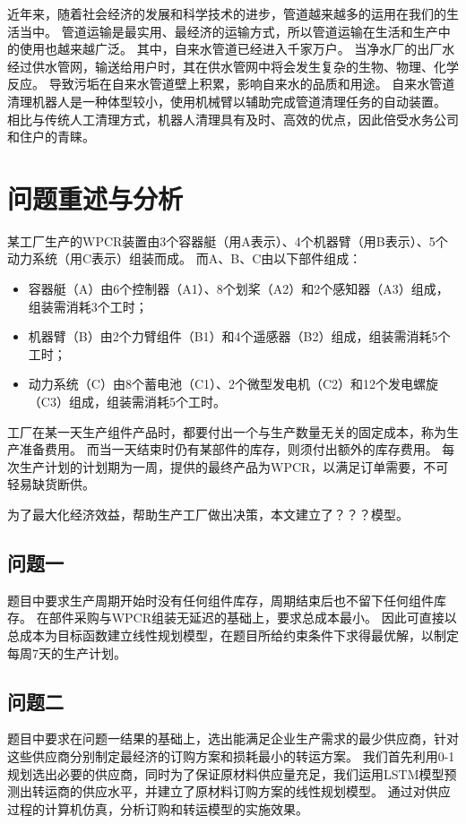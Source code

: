 近年来，随着社会经济的发展和科学技术的进步，管道越来越多的运用在我们的生活当中。
管道运输是最实用、最经济的运输方式，所以管道运输在生活和生产中的使用也越来越广泛\cite{智能管道清理机器人}。
其中，自来水管道已经进入千家万户。
当净水厂的出厂水经过供水管网，输送给用户时，其在供水管网中将会发生复杂的生物、物理、化学反应\cite{基于升力法的贯流式水轮机叶片设计及可行性分析}。
导致污垢在自来水管道壁上积累，影响自来水的品质和用途。
自来水管道清理机器人是一种体型较小，使用机械臂以辅助完成管道清理任务的自动装置。
相比与传统人工清理方式，机器人清理具有及时、高效的优点，因此倍受水务公司和住户的青睐。

\section{问题重述与分析}
某工厂生产的WPCR装置由3个容器艇（用A表示）、4个机器臂（用B表示）、5个动力系统（用C表示）组装而成。
而A、B、C由以下部件组成：
\begin{itemize}
\item 容器艇（A）由6个控制器（A1）、8个划桨（A2）和2个感知器（A3）组成，组装需消耗3个工时；
\item 机器臂（B）由2个力臂组件（B1）和4个遥感器（B2）组成，组装需消耗5个工时；
\item 动力系统（C）由8个蓄电池（C1）、2个微型发电机（C2）和12个发电螺旋（C3）组成，组装需消耗5个工时。
\end{itemize}

工厂在某一天生产组件产品时，都要付出一个与生产数量无关的固定成本，称为生产准备费用。
而当一天结束时仍有某部件的库存，则须付出额外的库存费用。
每次生产计划的计划期为一周，提供的最终产品为WPCR，以满足订单需要，不可轻易缺货断供。

为了最大化经济效益，帮助生产工厂做出决策，本文建立了？？？模型。

\subsection{问题一}
题目中要求生产周期开始时没有任何组件库存，周期结束后也不留下任何组件库存。
在部件采购与WPCR组装无延迟的基础上，要求总成本最小。
因此可直接以总成本为目标函数建立线性规划模型，在题目所给约束条件下求得最优解，以制定每周7天的生产计划。


\subsection{问题二}
题目中要求在问题一结果的基础上，选出能满足企业生产需求的最少供应商，针对这些供应商分别制定最经济的订购方案和损耗最小的转运方案。
我们首先利用0-1规划选出必要的供应商，同时为了保证原材料供应量充足，我们运用LSTM模型预测出转运商的供应水平，并建立了原材料订购方案的线性规划模型。
通过对供应过程的计算机仿真，分析订购和转运模型的实施效果。

